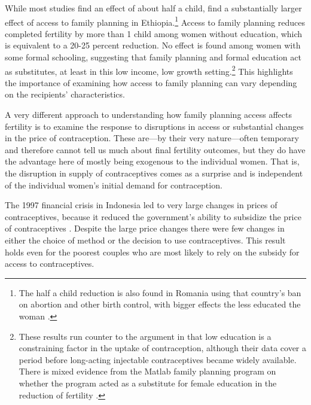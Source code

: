 While most studies find an effect of about half a child, \citet{Portner2011} find a substantially larger effect of access to family planning in Ethiopia.\footnote{The half a child reduction is also found in Romania using that country's ban on abortion and other birth control, with bigger effects the less educated the woman \citep{Pop-Eleches2010}.} Access to family planning reduces completed fertility by more than 1 child among women without education, which is equivalent to a 20-25 percent reduction. No effect is found among women with some formal schooling, suggesting that family planning and formal education act as substitutes, at least in this low income, low growth setting.\footnote{These results run counter to the argument in \citet{Feyisetan1996} that low education is a constraining factor in the uptake of contraception, although their data cover a period before long-acting injectable contraceptives became widely available. There is mixed evidence from the Matlab family planning program on whether the program acted as a substitute for female education in the reduction of fertility \citep{Sinha2005,Joshi2007}.} This highlights the importance of examining how access to family planning can vary depending on the recipients' characteristics.

A very different approach to understanding how family planning access affects fertility is to examine the response to disruptions in access or substantial changes in the price of contraception. These are---by their very nature---often temporary and therefore cannot tell us much about final fertility outcomes, but they do have the advantage here of mostly being exogenous to the individual women. That is, the disruption in supply of contraceptives comes as a surprise and is independent of the individual women's initial demand for contraception.

The 1997 financial crisis in Indonesia led to very large changes in prices of contraceptives, because it reduced the government's ability to subsidize the price of contraceptives \citep{McKelvey2012}. Despite the large price changes there were few changes in either the choice of method or the decision to use contraceptives. This result holds even for the poorest couples who are most likely to rely on the subsidy for access to contraceptives.

